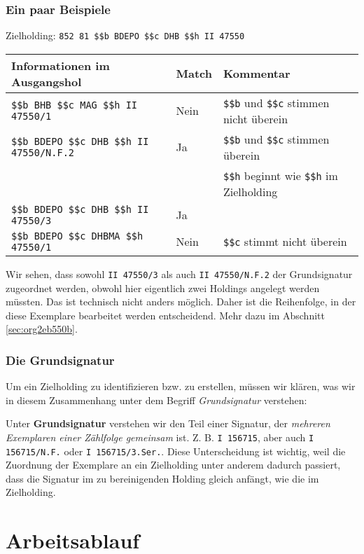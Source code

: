 \documentclass[10pt, a4paper]{scrartcl}
\begin{document}
\subsubsection{Ein paar Beispiele}
\label{sec:org69fc0e4}
Zielholding: \texttt{852 81 \$\$b BDEPO \$\$c DHB \$\$h II 47550}

\begin{center}
\begin{tabular}{lll}
Informationen im Ausgangshol & Match & Kommentar\\
\hline
\texttt{\$\$b BHB \$\$c MAG \$\$h II 47550/1} & Nein & \texttt{\$\$b} und \texttt{\$\$c} stimmen nicht überein\\
\texttt{\$\$b BDEPO \$\$c DHB \$\$h II 47550/N.F.2} & Ja & \texttt{\$\$b} und \texttt{\$\$c} stimmen überein\\
 &  & \texttt{\$\$h} beginnt wie \texttt{\$\$h} im Zielholding\\
\texttt{\$\$b BDEPO \$\$c DHB \$\$h II 47550/3} & Ja & \\
\texttt{\$\$b BDEPO \$\$c DHBMA \$\$h 47550/1} & Nein & \texttt{\$\$c} stimmt nicht überein\\
\end{tabular}
\end{center}

Wir sehen, dass sowohl \texttt{II 47550/3} als auch \texttt{II 47550/N.F.2} der
Grundsignatur zugeordnet werden, obwohl hier eigentlich zwei Holdings
angelegt werden müssten. Das ist technisch nicht anders möglich. Daher
ist die Reihenfolge, in der diese Exemplare bearbeitet werden
entscheidend. Mehr dazu im Abschnitt \ref{sec:org2eb550b}.



\subsubsection{Die Grundsignatur}
\label{sec:org9ba1d80}
Um ein Zielholding zu identifizieren bzw. zu erstellen, müssen wir klären,
was wir in diesem Zusammenhang unter dem Begriff \emph{Grundsignatur} verstehen:

Unter \textbf{Grundsignatur} verstehen wir den Teil einer Signatur, der \emph{mehreren
Exemplaren einer Zählfolge gemeinsam} ist. Z. B. \texttt{I 156715}, aber auch \texttt{I
        156715/N.F.} oder \texttt{I 156715/3.Ser.}. Diese Unterscheidung ist wichtig, weil
die Zuordnung der Exemplare an ein Zielholding unter anderem dadurch
passiert, dass die Signatur im zu bereinigenden Holding gleich anfängt, wie
die im Zielholding.
\section{Arbeitsablauf}
\label{sec:org81ce472}
\end{document}
